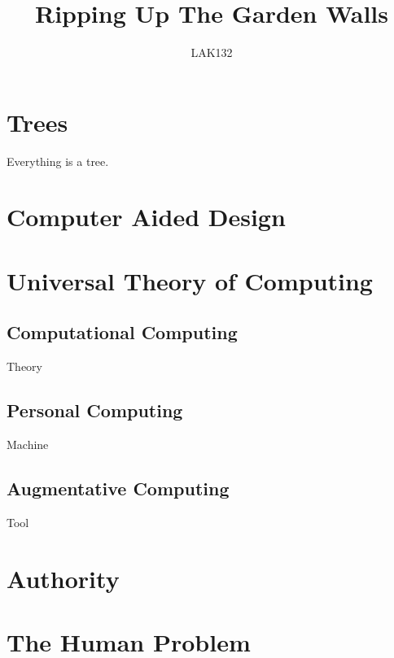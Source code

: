 \documentclass{article}
\title{Ripping Up The Garden Walls}
\author{LAK132}
\begin{document}
\maketitle

\tableofcontents

\section[trees]{Trees}

Everything is a tree.

\section[computer-aided-design]{Computer Aided Design}

\cite{can-a-machine-design}

\section[universal-theory-of-computing]{Universal Theory of Computing}

\cite{the-unix-operating-system}
\cite{what-unix-cost-us}

\subsection[computational-computing]{Computational Computing}

Theory

\subsection[personal-computing]{Personal Computing}

Machine

\subsection[augmentative-computing]{Augmentative Computing}

Tool

\section[authority]{Authority}

\cite{the-tragedy-of-systemd}

\section[the-human-problem]{The Human Problem}
\end{document}
